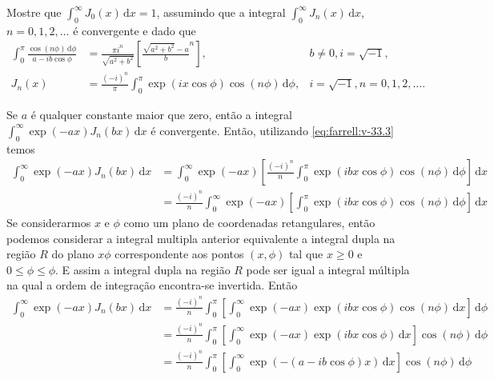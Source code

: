 \documentclass[a4paper,12pt, leqno, answers]{exam}
\begin{document}
\begin{questions}
     Mostre que $\int_0^\infty J_0(x) \,\mathrm{d}x = 1$, assumindo que a integral $\int_0^\infty J_n(x) \,\mathrm{d}x$, $n = 0, 1, 2, \ldots$ \'{e} convergente e dado que
    \begin{align}
        \int_0^\pi \frac{\cos(n \phi) \,\mathrm{d}\phi}{a - i b \cos \phi} &= \frac{\pi i^n}{\sqrt{a^2 + b^2}} \left[ \frac{\sqrt{a^2 + b^2} - a}{b}^n \right], & b \neq 0, i = \sqrt{-1}, \tag{$\bigstar$} \label{eq:farrell:v-33.2} \\
        J_n(x) &= \frac{(-i)^n}{\pi} \int_0^\pi \exp(i x \cos \phi) \cos(n \phi) \,\mathrm{d}\phi, & i = \sqrt{-1}, n = 0, 1, 2, \ldots. \tag{$\bigstar\bigstar$} \label{eq:farrell:v-33.3}
    \end{align}
    \begin{solution}
        Se $a$ \'{e} qualquer constante maior que zero, ent\~{a}o a integral $\int_0^\infty \exp(-a x) J_n(bx) \,\mathrm{d}x$ \'{e} convergente. Ent\~{a}o, utilizando \eqref{eq:farrell:v-33.3} temos
        \begin{align*}
            \int_0^\infty \exp(-a x) J_n(bx) \,\mathrm{d}x &= \int_0^\infty \exp(-a x) \left[ \frac{(-i)^n}{n} \int_0^\pi \exp(i b x \cos \phi) \cos(n \phi) \,\mathrm{d}\phi \right] \,\mathrm{d}x \\
            &= \frac{(-i)^n}{n} \int_0^\infty \exp(-a x) \left[ \int_0^\pi \exp(i b x \cos \phi) \cos(n \phi) \,\mathrm{d}\phi \right] \,\mathrm{d}x 
        \end{align*}
        Se considerarmos $x$ e $\phi$ como um plano de coordenadas retangulares, ent\~{a}o podemos considerar a integral multipla anterior equivalente a integral dupla na regi\~{a}o $R$ do plano $x\phi$ correspondente aos pontos $(x, \phi)$ tal que $x \geq 0$ e $0 \leq \phi \leq \phi$. E assim a integral dupla na regi\~{a}o $R$ pode ser igual a integral m\'{u}ltipla na qual a ordem de integra\c{c}\~{a}o encontra-se invertida. Ent\~{a}o
        \begin{align*}
            \int_0^\infty \exp(-a x) J_n(bx) \,\mathrm{d}x &= \frac{(-i)^n}{n} \int_0^\pi \left[ \int_0^\infty \exp(-a x) \exp(i b x \cos \phi) \cos(n \phi) \,\mathrm{d}x \right] \,\mathrm{d}\phi \\
            &= \frac{(-i)^n}{n} \int_0^\pi \left[ \int_0^\infty \exp(-a x) \exp(i b x \cos \phi) \,\mathrm{d}x \right] \cos(n \phi) \,\mathrm{d}\phi \\
            &= \frac{(-i)^n}{n} \int_0^\pi \left[ \int_0^\infty \exp(-(a - i b \cos \phi)x) \,\mathrm{d}x \right] \cos(n \phi) \,\mathrm{d}\phi \\

\end{align*}
\end{solution}
\end{questions}
\end{document}
